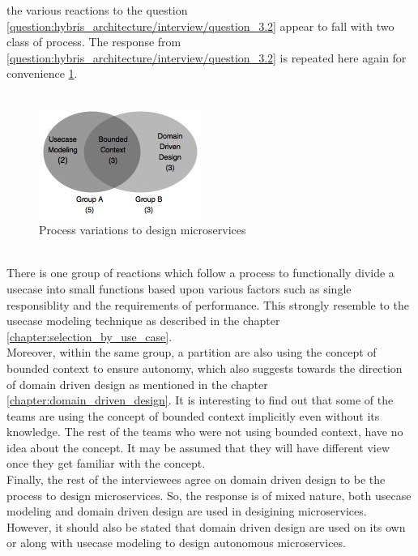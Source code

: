 the various reactions to the question \ref{question:hybris_architecture/interview/question_3.2} appear to fall with two class of process. The response from \ref{question:hybris_architecture/interview/question_3.2} is repeated here again for convenience \ref{fig:hybris_architecture/interview/process_variations_to_design_microservices}.\\
\\
\begin{figure}[H]
\begin{center}
\includegraphics[scale=0.5]{figures/hybris-architecture-three}
\caption{Process variations to design microservices}
\label{fig:hybris_architecture/interview/process_variations_to_design_microservices}
\end{center}
\end{figure}
\\
There is one group of reactions which follow a process to functionally divide a usecase into small functions based upon various factors such as single responsiblity and the requirements of performance. This strongly resemble to the usecase modeling technique as described in the chapter \ref{chapter:selection_by_use_case}. 
\\Moreover, within the same group, a partition are also using the concept of bounded context to ensure autonomy, which also suggests towards the direction of domain driven design as mentioned in the chapter \ref{chapter:domain_driven_design}. It is interesting to find out that some of the teams are using the concept of bounded context implicitly even without its knowledge. The rest of the teams who were not using bounded context, have no idea about the concept. It may be assumed that they will have different view once they get familiar with the concept.
\\
Finally, the rest of the interviewees agree on domain driven design to be the process to design microservices. So, the  response is of mixed nature, both usecase modeling and domain driven design are used in desigining microservices. However, it should also be stated that domain driven design are used on its own or along with usecase modeling to design autonomous microservices.

